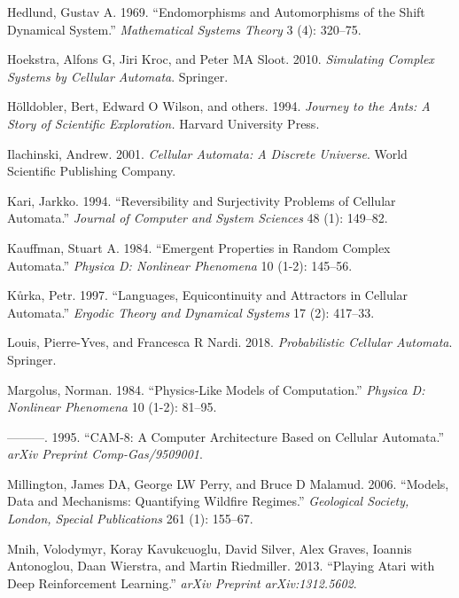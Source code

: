 \documentclass[
  openany]{book}
\newlength{\cslhangindent}
\newenvironment{cslreferences}%
  {\setlength{\parindent}{0pt}%
  \everypar{\setlength{\hangindent}{\cslhangindent}}\ignorespaces}%
  {\par}
\begin{document}
\begin{cslreferences}
\leavevmode\hypertarget{ref-hedlund1969endomorphisms}{}%
Hedlund, Gustav A. 1969. ``Endomorphisms and Automorphisms of the Shift Dynamical System.'' \emph{Mathematical Systems Theory} 3 (4): 320--75.

\leavevmode\hypertarget{ref-hoekstra2010simulating}{}%
Hoekstra, Alfons G, Jiri Kroc, and Peter MA Sloot. 2010. \emph{Simulating Complex Systems by Cellular Automata}. Springer.

\leavevmode\hypertarget{ref-holldobler1994journey}{}%
Hölldobler, Bert, Edward O Wilson, and others. 1994. \emph{Journey to the Ants: A Story of Scientific Exploration.} Harvard University Press.

\leavevmode\hypertarget{ref-ilachinski2001cellular}{}%
Ilachinski, Andrew. 2001. \emph{Cellular Automata: A Discrete Universe}. World Scientific Publishing Company.

\leavevmode\hypertarget{ref-kari1994reversibility}{}%
Kari, Jarkko. 1994. ``Reversibility and Surjectivity Problems of Cellular Automata.'' \emph{Journal of Computer and System Sciences} 48 (1): 149--82.

\leavevmode\hypertarget{ref-kauffman1984emergent}{}%
Kauffman, Stuart A. 1984. ``Emergent Properties in Random Complex Automata.'' \emph{Physica D: Nonlinear Phenomena} 10 (1-2): 145--56.

\leavevmode\hypertarget{ref-kuurka1997languages}{}%
Kůrka, Petr. 1997. ``Languages, Equicontinuity and Attractors in Cellular Automata.'' \emph{Ergodic Theory and Dynamical Systems} 17 (2): 417--33.

\leavevmode\hypertarget{ref-louis2018probabilistic}{}%
Louis, Pierre-Yves, and Francesca R Nardi. 2018. \emph{Probabilistic Cellular Automata}. Springer.

\leavevmode\hypertarget{ref-margolus1984physics}{}%
Margolus, Norman. 1984. ``Physics-Like Models of Computation.'' \emph{Physica D: Nonlinear Phenomena} 10 (1-2): 81--95.

\leavevmode\hypertarget{ref-margolus1995cam}{}%
---------. 1995. ``CAM-8: A Computer Architecture Based on Cellular Automata.'' \emph{arXiv Preprint Comp-Gas/9509001}.

\leavevmode\hypertarget{ref-millington2006models}{}%
Millington, James DA, George LW Perry, and Bruce D Malamud. 2006. ``Models, Data and Mechanisms: Quantifying Wildfire Regimes.'' \emph{Geological Society, London, Special Publications} 261 (1): 155--67.

\leavevmode\hypertarget{ref-mnih2013playing}{}%
Mnih, Volodymyr, Koray Kavukcuoglu, David Silver, Alex Graves, Ioannis Antonoglou, Daan Wierstra, and Martin Riedmiller. 2013. ``Playing Atari with Deep Reinforcement Learning.'' \emph{arXiv Preprint arXiv:1312.5602}.


\end{cslreferences}
\end{document}
